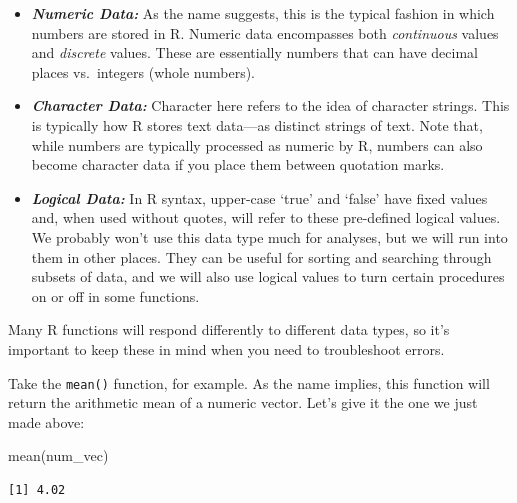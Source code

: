 \documentclass[
  letterpaper,
  DIV=11,
  numbers=noendperiod]{scrreprt}
\newenvironment{Shaded}{\begin{snugshade}}{\end{snugshade}}
\newcommand{\FunctionTok}[1]{\textcolor[rgb]{0.28,0.35,0.67}{#1}}
\newcommand{\NormalTok}[1]{\textcolor[rgb]{0.00,0.23,0.31}{#1}}
\begin{document}
\begin{itemize}
\item
  \textbf{\emph{Numeric Data:}} As the name suggests, this is the
  typical fashion in which numbers are stored in R. Numeric data
  encompasses both \emph{continuous} values and \emph{discrete} values.
  These are essentially numbers that can have decimal places
  vs.~integers (whole numbers).
\item
  \textbf{\emph{Character Data:}} Character here refers to the idea of
  character strings. This is typically how R stores text data---as
  distinct strings of text. Note that, while numbers are typically
  processed as numeric by R, numbers can also become character data if
  you place them between quotation marks.
\item
  \textbf{\emph{Logical Data:}} In R syntax, upper-case `true' and
  `false' have fixed values and, when used without quotes, will refer to
  these pre-defined logical values. We probably won't use this data type
  much for analyses, but we will run into them in other places. They can
  be useful for sorting and searching through subsets of data, and we
  will also use logical values to turn certain procedures on or off in
  some functions.
\end{itemize}

Many R functions will respond differently to different data types, so
it's important to keep these in mind when you need to troubleshoot
errors.

Take the \texttt{mean()} function, for example. As the name implies,
this function will return the arithmetic mean of a numeric vector. Let's
give it the one we just made above:

\begin{Shaded}
\begin{Highlighting}[]
\FunctionTok{mean}\NormalTok{(num\_vec)}
\end{Highlighting}
\end{Shaded}

\begin{verbatim}
[1] 4.02
\end{verbatim}
\end{document}
